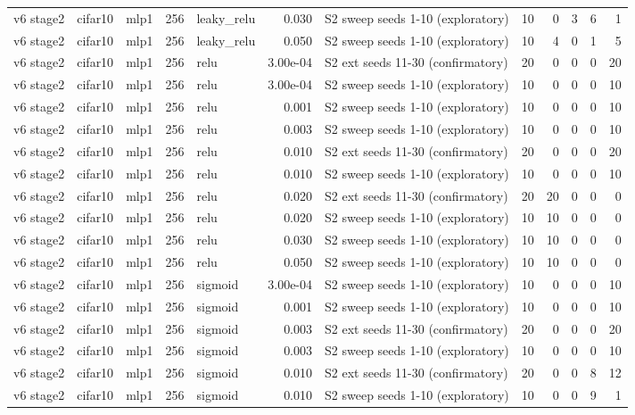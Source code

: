 \begin{table}[htbp]
{\begin{tabular}{@{}lllrlrlrrrrr@{}}
v6 stage2 & cifar10 & mlp1 & 256 & leaky\_relu & 0.030 & S2 sweep seeds 1-10 (exploratory) & 10 & 0 & 3 & 6 & 1 \\
v6 stage2 & cifar10 & mlp1 & 256 & leaky\_relu & 0.050 & S2 sweep seeds 1-10 (exploratory) & 10 & 4 & 0 & 1 & 5 \\
v6 stage2 & cifar10 & mlp1 & 256 & relu & 3.00e-04 & S2 ext seeds 11-30 (confirmatory) & 20 & 0 & 0 & 0 & 20 \\
v6 stage2 & cifar10 & mlp1 & 256 & relu & 3.00e-04 & S2 sweep seeds 1-10 (exploratory) & 10 & 0 & 0 & 0 & 10 \\
v6 stage2 & cifar10 & mlp1 & 256 & relu & 0.001 & S2 sweep seeds 1-10 (exploratory) & 10 & 0 & 0 & 0 & 10 \\
v6 stage2 & cifar10 & mlp1 & 256 & relu & 0.003 & S2 sweep seeds 1-10 (exploratory) & 10 & 0 & 0 & 0 & 10 \\
v6 stage2 & cifar10 & mlp1 & 256 & relu & 0.010 & S2 ext seeds 11-30 (confirmatory) & 20 & 0 & 0 & 0 & 20 \\
v6 stage2 & cifar10 & mlp1 & 256 & relu & 0.010 & S2 sweep seeds 1-10 (exploratory) & 10 & 0 & 0 & 0 & 10 \\
v6 stage2 & cifar10 & mlp1 & 256 & relu & 0.020 & S2 ext seeds 11-30 (confirmatory) & 20 & 20 & 0 & 0 & 0 \\
v6 stage2 & cifar10 & mlp1 & 256 & relu & 0.020 & S2 sweep seeds 1-10 (exploratory) & 10 & 10 & 0 & 0 & 0 \\
v6 stage2 & cifar10 & mlp1 & 256 & relu & 0.030 & S2 sweep seeds 1-10 (exploratory) & 10 & 10 & 0 & 0 & 0 \\
v6 stage2 & cifar10 & mlp1 & 256 & relu & 0.050 & S2 sweep seeds 1-10 (exploratory) & 10 & 10 & 0 & 0 & 0 \\
v6 stage2 & cifar10 & mlp1 & 256 & sigmoid & 3.00e-04 & S2 sweep seeds 1-10 (exploratory) & 10 & 0 & 0 & 0 & 10 \\
v6 stage2 & cifar10 & mlp1 & 256 & sigmoid & 0.001 & S2 sweep seeds 1-10 (exploratory) & 10 & 0 & 0 & 0 & 10 \\
v6 stage2 & cifar10 & mlp1 & 256 & sigmoid & 0.003 & S2 ext seeds 11-30 (confirmatory) & 20 & 0 & 0 & 0 & 20 \\
v6 stage2 & cifar10 & mlp1 & 256 & sigmoid & 0.003 & S2 sweep seeds 1-10 (exploratory) & 10 & 0 & 0 & 0 & 10 \\
v6 stage2 & cifar10 & mlp1 & 256 & sigmoid & 0.010 & S2 ext seeds 11-30 (confirmatory) & 20 & 0 & 0 & 8 & 12 \\
v6 stage2 & cifar10 & mlp1 & 256 & sigmoid & 0.010 & S2 sweep seeds 1-10 (exploratory) & 10 & 0 & 0 & 9 & 1 \\

\end{tabular}}
\end{table}
